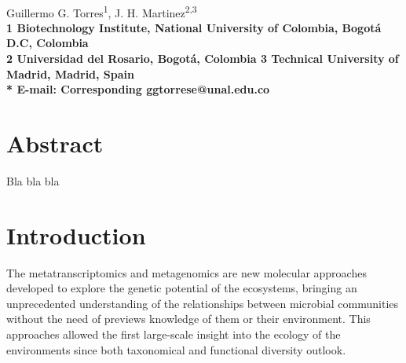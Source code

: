 \documentclass[10pt,letterpaper]{article}
\date{}
\begin{document}
\vspace*{0.35in}

\begin{flushleft}
{\Large
\textbf{}
}
\newline
\\
Guillermo G. Torres\textsuperscript{1},
J. H. Martinez\textsuperscript{2,3}
\\
\bf{1} Biotechnology Institute, National University of Colombia, Bogotá D.C, Colombia
\\
\bf{2} Universidad del Rosario, Bogotá, Colombia
\bf{3} Technical University of Madrid, Madrid, Spain
\\

% 
%


* E-mail: Corresponding ggtorrese@unal.edu.co
\end{flushleft}

\section*{Abstract}
Bla bla bla

\linenumbers

\section*{Introduction}
The metatranscriptomics and metagenomics are new molecular approaches developed to explore the genetic potential of the ecosystems, bringing an unprecedented understanding of the relationships between microbial communities without the need of previews knowledge of them or their environment. This approaches allowed the first large-scale insight into the ecology of the environments since both taxonomical and functional diversity outlook.
	
\end{document}
